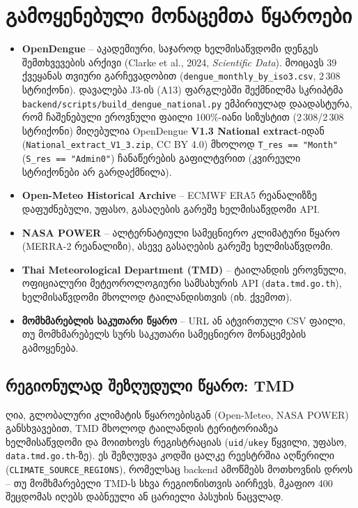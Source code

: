 \documentclass[11pt,a4paper]{article}
\begin{document}
\section{გამოყენებული მონაცემთა წყაროები}

\begin{itemize}[leftmargin=1.4em]
  \item \textbf{OpenDengue} -- აკადემიური, საჯაროდ ხელმისაწვდომი დენგეს
    შემთხვევების არქივი (Clarke et al., 2024, \emph{Scientific Data}).
    მოიცავს 39 ქვეყანას თვიური გარჩევადობით (\texttt{dengue\_monthly\_by\_iso3.csv}, 2\,308 სტრიქონი).
    დავალება J3-ის (A13) ფარგლებში შექმნილმა სკრიპტმა \texttt{backend/scripts/build\_dengue\_national.py}
    ემპირიულად დაადასტურა, რომ ჩაშენებული ეროვნული ფაილი 100\%-იანი სიზუსტით (2\,308/2\,308 სტრიქონი)
    მიღებულია OpenDengue \textbf{V1.3 National extract}-იდან (\texttt{National\_extract\_V1\_3.zip}, CC BY 4.0)
    მხოლოდ \texttt{T\_res == "Month"} (\texttt{S\_res == "Admin0"}) ჩანაწერების გაფილტვრით (კვირეული სტრიქონები არ გარდაქმნილა).
  \item \textbf{Open-Meteo Historical Archive} -- ECMWF ERA5 რეანალიზზე
    დაფუძნებული, უფასო, გასაღების გარეშე ხელმისაწვდომი API.
  \item \textbf{NASA POWER} -- ალტერნატიული სამეცნიერო კლიმატური წყარო
    (MERRA-2 რეანალიზი), ასევე გასაღების გარეშე ხელმისაწვდომი.
  \item \textbf{Thai Meteorological Department (TMD)} -- ტაილანდის
    ეროვნული, ოფიციალური მეტეოროლოგიური სამსახურის API
    (\texttt{data.tmd.go.th}), ხელმისაწვდომი მხოლოდ ტაილანდისთვის
    (იხ. ქვემოთ).
  \item \textbf{მომხმარებლის საკუთარი წყარო} -- URL ან ატვირთული CSV
    ფაილი, თუ მომხმარებელს სურს საკუთარი სამეცნიერო მონაცემების გამოყენება.
\end{itemize}

\subsection{რეგიონულად შეზღუდული წყარო: TMD}
ღია, გლობალური კლიმატის წყაროებისგან (Open-Meteo, NASA POWER)
განსხვავებით, TMD მხოლოდ ტაილანდის ტერიტორიაზეა ხელმისაწვდომი და
მოითხოვს რეგისტრაციას (\texttt{uid}/\texttt{ukey} წყვილი, უფასო,
\texttt{data.tmd.go.th}-ზე). ეს შეზღუდვა კოდში ცალკე რეესტრშია
აღწერილი (\texttt{CLIMATE\_SOURCE\_REGIONS}), რომელსაც backend
ამოწმებს მოთხოვნის დროს -- თუ მომხმარებელი TMD-ს სხვა რეგიონისთვის
აირჩევს, მკაფიო 400 შეცდომას იღებს დაბნეული ან ცარიელი პასუხის
ნაცვლად.
\end{document}
